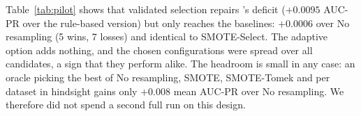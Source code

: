 Table~\ref{tab:pilot} shows that validated selection repairs \ars{}'s deficit ($+0.0095$ AUC-PR over the rule-based
version) but only reaches the baselines: $+0.0006$ over No resampling (5 wins, 7 losses) and identical to SMOTE-Select.
The adaptive option adds nothing, and the chosen configurations were spread over all candidates, a sign that they
perform alike. The headroom is small in any case: an oracle picking the best of No resampling, SMOTE, SMOTE-Tomek and
\ars{} per dataset in hindsight gains only $+0.008$ mean AUC-PR over No resampling. We therefore did not spend a
second full run on this design.

\begin{table}
  \centering
  \caption{Validated-selection pilot on 12 development datasets (5 folds, one machine): mean score (average rank among
  the five variants).}
  \label{tab:pilot}
  \scriptsize
  \setlength{\tabcolsep}{2pt}
  \resizebox{\linewidth}{!}{}
\end{table}
